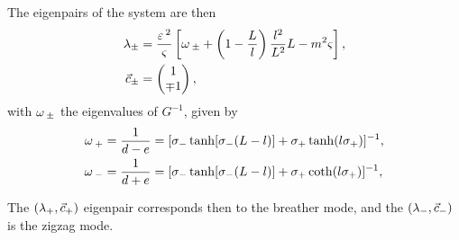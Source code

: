The eigenpairs of the system are then
% 
\begin{equation}
\begin{split}
\label{eqn:lam_pm}
  \lambda_{\pm} &= \frac{\varepsilon\,^2}{\varsigma}\left[\omega\,_{\pm} + \left(1-\frac{L}{l} \right)\frac{l^2}{L^2}L - m^2\varsigma \right],\\
  \vec{c}_{\pm} &= \begin{pmatrix} 1\\ \mp1 \end{pmatrix},
\end{split}
\end{equation}
% 
with $\omega\,_{\pm}$ the eigenvalues of $G^{-1}$, given by
\[
  \begin{split}
    \omega\,_+ &= \frac{1}{d-e} = [\sigma_-\tanh[\sigma_-(L-l)]+\sigma_+\tanh(l\sigma_+)]^{-1},\\
	\omega\,_- &= \frac{1}{d+e} = [\sigma_-\tanh[\sigma_-(L-l)]+\sigma_+\coth(l\sigma_+)]^{-1},\\
  \end{split}
\]

The $(\lambda_+,\vec{c}_+)$ eigenpair corresponds then to the breather mode, and the $(\lambda_-,\vec{c}_-)$ is the zigzag mode.

